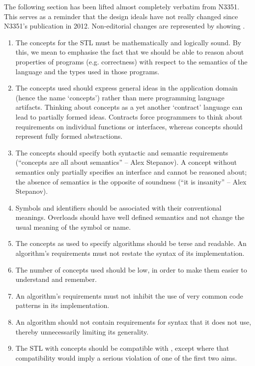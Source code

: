 The following section has been lifted almost completely verbatim from N3351. This serves as a
reminder that the design ideals have not really changed since N3351's publication in 2012.
Non-editorial changes are represented by showing .
\begin{enumerate}
   \item The concepts for the STL must be mathematically and logically sound. By this, we mean to
         emphasise the fact that we should be able to reason about properties of programs (e.g.
         correctness) with respect to the semantics of the language and the types used in those
         programs.
   \item The concepts used should express general ideas in the application domain (hence the name
         `concepts') rather than mere programming language artifacts. Thinking about concepts as a
         yet another `contract' language can lead to partially formed ideas. Contracts force
         programmers to think about requirements on individual functions or interfaces, whereas
         concepts should represent fully formed abstractions.
   \item The concepts should specify both syntactic and semantic requirements (``concepts are all
         about semantics'' -- Alex Stepanov). A concept without semantics only partially specifies
         an interface and cannot be reasoned about; the absence of semantics is the opposite of
         soundness (``it is insanity'' -- Alex Stepanov).
   \item Symbols and identifiers should be associated with their conventional meanings. Overloads
         should have well defined semantics and not change the usual meaning of the symbol or name.
   \item The concepts as used to specify algorithms should be terse and readable. An algorithm's
         requirements must not restate the syntax of its implementation.
   \item The number of concepts used should be low, in order to make them easier to understand and
         remember.
   \item An algorithm's requirements must not inhibit the use of very common code patterns in its
         implementation.
   \item An algorithm should not contain requirements for syntax that it does not use, thereby
         unnecessarily limiting its generality.
   \item The STL with concepts should be compatible with , except where
         that compatibility would imply a serious violation of one of the first two aims.
\end{enumerate}

